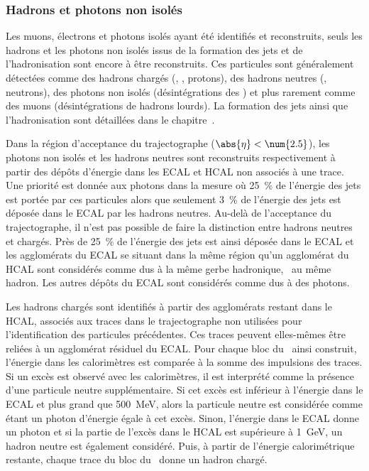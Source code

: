 \subsubsection{Hadrons et photons non isolés}
Les muons, électrons et photons isolés ayant été identifiés et reconstruits, seuls les hadrons et les photons non isolés issus de la formation des jets et de l'hadronisation sont encore à être reconstruits.
Ces particules sont généralement détectées comme des hadrons chargés (\pionpm, \Kaonpm, protons), des hadrons neutres (\Kaonlong, neutrons), des photons non isolés (désintégrations des \pionnull) et plus rarement comme des muons (désintégrations de hadrons lourds).
La formation des jets ainsi que l'hadronisation sont détaillées dans le chapitre~.
\par Dans la région d'acceptance du trajectographe ($\abs{\eta}<\num{2.5}$), les photons non isolés et les hadrons neutres sont reconstruits respectivement à partir des dépôts d'énergie dans les ECAL et HCAL non associés à une trace.
Une priorité est donnée aux photons dans la mesure où \SI{25}{\%} de l'énergie des jets est portée par ces particules alors que seulement \SI{3}{\%} de l'énergie des jets est déposée dans le ECAL par les hadrons neutres.
Au-delà de l'acceptance du trajectographe, il n'est pas possible de faire la distinction entre hadrons neutres et chargés.
Près de \SI{25}{\%} de l'énergie des jets est ainsi déposée dans le ECAL et les agglomérats du ECAL se situant dans la même région qu'un agglomérat du HCAL sont considérés comme dus à la même gerbe hadronique, \ie\ au même hadron.
Les autres dépôts du ECAL sont considérés comme dus à des photons.
\par Les hadrons chargés sont identifiés à partir des agglomérats restant dans le HCAL, associés aux traces dans le trajectographe non utilisées pour l'identification des particules précédentes.
Ces traces peuvent elles-mêmes être reliées à un agglomérat résiduel du ECAL.
Pour chaque bloc du \PF\ ainsi construit, l'énergie dans les calorimètres est comparée à la somme des impulsions des traces.
Si un excès est observé avec les calorimètres, il est interprété comme la présence d'une particule neutre supplémentaire.
Si cet excès est inférieur à l'énergie dans le ECAL et plus grand que \SI{500}{\MeV}, alors la particule neutre est considérée comme étant un photon d'énergie égale à cet excès.
Sinon, l'énergie dans le ECAL donne un photon et si la partie de l'excès dans le HCAL est supérieure à \SI{1}{\GeV}, un hadron neutre est également considéré.
Puis, à partir de l'énergie calorimétrique restante, chaque trace du bloc du \PF\ donne un hadron chargé.
